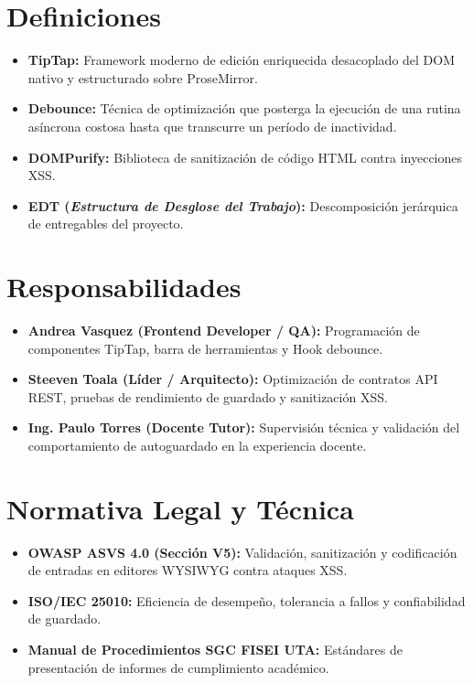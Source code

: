 \documentclass[12pt,a4paper]{article}
\begin{document}
\section{Definiciones}
\begin{itemize}[leftmargin=1.5em, itemsep=2pt, topsep=2pt]
    \item \textbf{TipTap:} Framework moderno de edición enriquecida desacoplado del DOM nativo y estructurado sobre ProseMirror.
    \item \textbf{Debounce:} Técnica de optimización que posterga la ejecución de una rutina asíncrona costosa hasta que transcurre un período de inactividad.
    \item \textbf{DOMPurify:} Biblioteca de sanitización de código HTML contra inyecciones XSS.
    \item \textbf{EDT (\textit{Estructura de Desglose del Trabajo}):} Descomposición jerárquica de entregables del proyecto.
\end{itemize}

\section{Responsabilidades}
\begin{itemize}[leftmargin=1.5em, itemsep=2pt, topsep=2pt]
    \item \textbf{Andrea Vasquez (Frontend Developer / QA):} Programación de componentes TipTap, barra de herramientas y Hook debounce.
    \item \textbf{Steeven Toala (Líder / Arquitecto):} Optimización de contratos API REST, pruebas de rendimiento de guardado y sanitización XSS.
    \item \textbf{Ing. Paulo Torres (Docente Tutor):} Supervisión técnica y validación del comportamiento de autoguardado en la experiencia docente.
\end{itemize}

\section{Normativa Legal y Técnica}
\begin{itemize}[leftmargin=1.5em, itemsep=2pt]
    \item \textbf{OWASP ASVS 4.0 (Sección V5):} Validación, sanitización y codificación de entradas en editores WYSIWYG contra ataques XSS.
    \item \textbf{ISO/IEC 25010:} Eficiencia de desempeño, tolerancia a fallos y confiabilidad de guardado.
    \item \textbf{Manual de Procedimientos SGC FISEI UTA:} Estándares de presentación de informes de cumplimiento académico.
\end{itemize}
\end{document}

